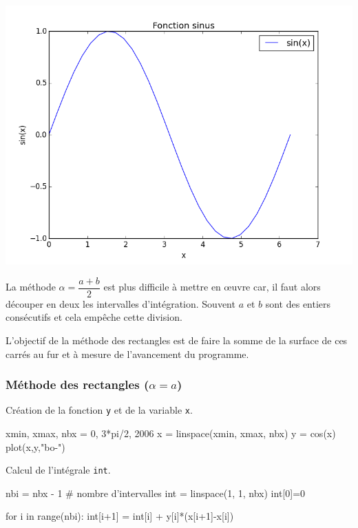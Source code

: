 \begin{frame}[fragile]
\begin{minipage}{0.3\linewidth}
\begin{center}
	\includegraphics[width=0.9\linewidth]{img/courbe3}
\end{center}
\end{minipage}

La méthode $\alpha=\dfrac{a+b}{2}$ est plus difficile à mettre en \oe uvre car, il faut alors découper en deux les intervalles d'intégration. Souvent $a$ et $b$ sont des entiers consécutifs et cela empêche cette division.

L'objectif de la méthode des rectangles est de faire la somme de la surface de ces carrés au fur et à mesure de l'avancement du programme.
\end{frame}

\begin{frame}[fragile]
\frametitle{Méthode des rectangles ($\alpha=a$)}

Création de la fonction \verb?y? et de la variable \verb?x?.
\begin{GrayBox}[0.85\textwidth]
\begin{verbatimtab}[3]
xmin, xmax, nbx = 0, 3*pi/2, 2006
x = linspace(xmin, xmax, nbx)
y = cos(x)
plot(x,y,"bo-")
\end{verbatimtab}
\end{GrayBox}

Calcul de l'intégrale \verb?int?.
\begin{GrayBox}[0.85\textwidth]
\begin{verbatimtab}[3]
nbi = nbx - 1 # nombre d'intervalles
int = linspace(1, 1, nbx)
int[0]=0

for i in range(nbi):
    int[i+1] = int[i] + y[i]*(x[i+1]-x[i])
\end{verbatimtab}
\end{GrayBox}

\end{frame}

